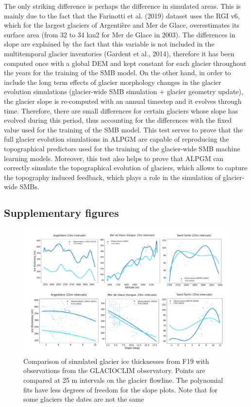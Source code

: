 The only striking difference is perhaps the difference in simulated areas. This is mainly due to the fact that the Farinotti et al. (2019) dataset uses the RGI v6, which for the largest glaciers of Argentière and Mer de Glace, overestimates its surface area (from 32 to 34 km2 for Mer de Glace in 2003). The differences in slope are explained by the fact that this variable is not included in the multitemporal glacier inventories (Gardent et al., 2014), therefore it has been computed once with a global DEM and kept constant for each glacier throughout the years for the training of the SMB model. On the other hand, in order to include the long term effects of glacier morphology changes in the glacier evolution simulations (glacier-wide SMB simulation + glacier geometry update), the glacier slope is re-computed with an annual timestep and it evolves through time. Therefore, there are small differences for certain glaciers whose slope has evolved during this period, thus accounting for the differences with the fixed value used for the training of the SMB model.
This test serves to prove that the full glacier evolution simulations in ALPGM are capable of reproducing the topographical predictors used for the training of the glacier-wide SMB machine learning models. Moreover, this test also helps to prove that ALPGM can correctly simulate the topographical evolution of glaciers, which allows to capture the topography induced feedback, which plays a role in the simulation of glacier-wide SMBs. 

\subsection{Supplementary figures}

\begin{figure}[h]
\centering
\includegraphics[width=15cm]{Figures/methods/Figure_S2.png}
\caption{Comparison of simulated glacier ice thicknesses from F19 with observations from the GLACIOCLIM observatory. Points are compared at 25 m intervals on the glacier flowline. The polynomial fits have less degrees of freedom for the slope plots. Note that for some glaciers the dates are not the same}
\label{methods:figS2}
\end{figure}


